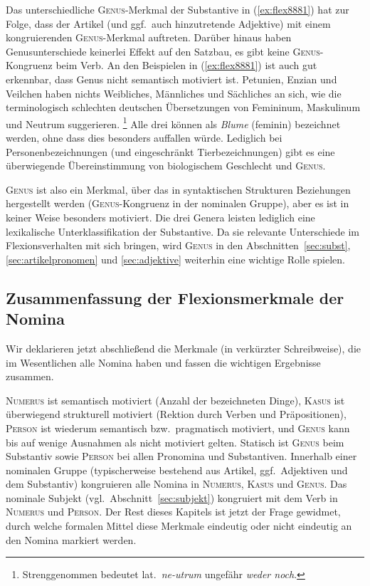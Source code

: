 Das unterschiedliche \textsc{Genus}-Merkmal der Substantive in (\ref{ex:flex8881}) hat zur Folge, dass der Artikel (und ggf.\ auch hinzutretende Adjektive) mit einem kongruierenden \textsc{Genus}-Merkmal auftreten.
Darüber hinaus haben Genusunterschiede keinerlei Effekt auf den Satzbau, es gibt \zB keine \textsc{Genus}-Kongruenz beim Verb.
 An den Beispielen in (\ref{ex:flex8881}) ist auch gut erkennbar, dass Genus nicht semantisch motiviert ist.
Petunien, Enzian und Veilchen haben nichts Weibliches, Männliches und Sächliches an sich, wie die terminologisch schlechten deutschen Übersetzungen von Femininum, Maskulinum und Neutrum suggerieren.%
\footnote{Strenggenommen bedeutet lat.\ \textit{ne-utrum} ungefähr \textit{weder noch}.}
Alle drei können als \textit{Blume} (feminin) bezeichnet werden, ohne dass dies besonders auffallen würde.
Lediglich bei Personenbezeichnungen (und eingeschränkt Tierbezeichnungen) gibt es eine überwiegende Übereinstimmung von biologischem Geschlecht und \textsc{Genus}.

\textsc{Genus} ist also ein Merkmal, über das in syntaktischen Strukturen Beziehungen hergestellt werden (\textsc{Genus}-Kongruenz in der nominalen Gruppe), aber es ist in keiner Weise besonders motiviert.
Die drei Genera leisten lediglich eine lexikalische Unterklassifikation der Substantive.
Da sie relevante Unterschiede im Flexionsverhalten mit sich bringen, wird \textsc{Genus} in den Abschnitten~\ref{sec:subst}, \ref{sec:artikelpronomen} und \ref{sec:adjektive} weiterhin eine wichtige Rolle spielen.

\subsection{Zusammenfassung der Flexionsmerkmale der Nomina}

Wir deklarieren jetzt abschließend die Merkmale (in verkürzter Schreibweise), die im Wesentlichen alle Nomina haben und fassen die wichtigen Ergebnisse zusammen.

\begin{exe}
\end{exe}

\textsc{Numerus} ist semantisch motiviert (Anzahl der bezeichneten Dinge), \textsc{Kasus} ist überwiegend strukturell motiviert (Rektion durch Verben und Präpositionen), \textsc{Person} ist wiederum semantisch bzw.\ pragmatisch motiviert, und \textsc{Genus} kann bis auf wenige Ausnahmen als nicht motiviert gelten.
Statisch ist \textsc{Genus} beim Substantiv sowie \textsc{Person} bei allen Pronomina und Substantiven.
Innerhalb einer nominalen Gruppe (typischerweise bestehend aus Artikel, ggf.\ Adjektiven und dem Substantiv) kongruieren alle Nomina in \textsc{Numerus}, \textsc{Kasus} und \textsc{Genus}.
Das nominale Subjekt (vgl.\ Abschnitt~\ref{sec:subjekt}) kongruiert mit dem Verb in \textsc{Numerus} und \textsc{Person}.
Der Rest dieses Kapitels ist jetzt der Frage gewidmet, durch welche formalen Mittel diese Merkmale eindeutig oder nicht eindeutig an den Nomina markiert werden.

